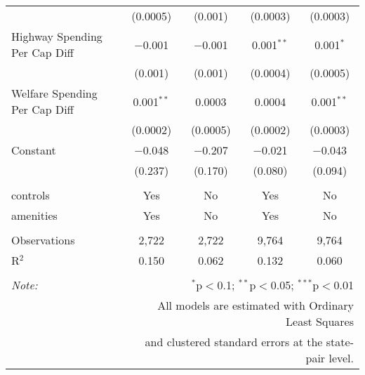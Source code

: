 \begin{table}[!htbp]
\begin{tabular}{@{\extracolsep{5pt}}lcccc}
  & (0.0005) & (0.001) & (0.0003) & (0.0003) \\ 
  Highway Spending Per Cap Diff & $-$0.001 & $-$0.001 & 0.001$^{**}$ & 0.001$^{*}$ \\ 
  & (0.001) & (0.001) & (0.0004) & (0.0005) \\ 
  Welfare Spending Per Cap Diff & 0.001$^{**}$ & 0.0003 & 0.0004 & 0.001$^{**}$ \\ 
  & (0.0002) & (0.0005) & (0.0002) & (0.0003) \\ 
  Constant & $-$0.048 & $-$0.207 & $-$0.021 & $-$0.043 \\ 
  & (0.237) & (0.170) & (0.080) & (0.094) \\ 
 \hline \\[-1.8ex] 
controls & Yes & No & Yes & No \\ 
amenities & Yes & No & Yes & No \\ 
\hline \\[-1.8ex] 
Observations & 2,722 & 2,722 & 9,764 & 9,764 \\ 
R$^{2}$ & 0.150 & 0.062 & 0.132 & 0.060 \\ 
\hline 
\hline \\[-1.8ex] 
\textit{Note:}  & \multicolumn{4}{r}{$^{*}$p$<$0.1; $^{**}$p$<$0.05; $^{***}$p$<$0.01} \\ 
 & \multicolumn{4}{r}{All models are estimated with Ordinary Least Squares} \\ 
 & \multicolumn{4}{r}{and clustered standard errors at the state-pair level.} \\ 
\end{tabular} 
\end{table} 
